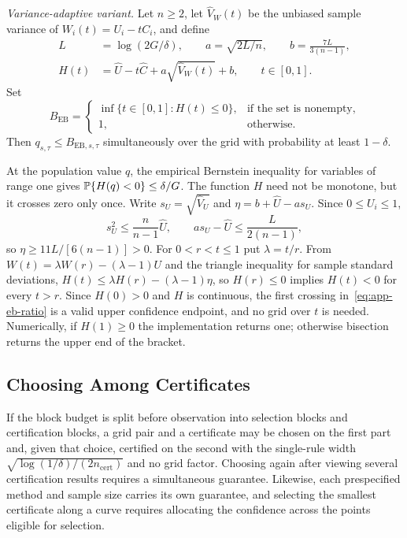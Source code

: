 \noindent\emph{Variance-adaptive variant.}\quad
Let $n\ge2$, let $\widehat V_W(t)$ be the unbiased sample variance of $W_i(t)=U_i-tC_i$, and define
\begin{align}
L&=\log(2G/\delta),\qquad a=\sqrt{2L/n},\qquad b=\frac{7L}{3(n-1)},\\
H(t)&=\widehat U-t\widehat C+a\sqrt{\widehat V_W(t)}+b,\qquad t\in[0,1].
\end{align}
Set
\begin{equation}
B_{\mathrm{EB}}=
\begin{cases}
\inf\{t\in[0,1]:H(t)\le0\},&\text{if the set is nonempty},\\
1,&\text{otherwise}.
\end{cases}
\label{eq:app-eb-ratio}
\end{equation}
Then $q_{s,\tau}\le B_{\mathrm{EB},s,\tau}$ simultaneously over the grid with probability at least $1-\delta$.

At the population value $q$, the empirical Bernstein inequality for variables of range one gives $\mathbb{P}\{H(q)<0\}\le\delta/G$. The function $H$ need not be monotone, but it crosses zero only once. Write $s_U=\sqrt{\widehat V_U}$ and $\eta=b+\widehat U-as_U$. Since $0\le U_i\le1$,
\begin{equation}
s_U^2\le\frac{n}{n-1}\widehat U,\qquad as_U-\widehat U\le\frac{L}{2(n-1)},
\end{equation}
so $\eta\ge11L/[6(n-1)]>0$. For $0<r<t\le1$ put $\lambda=t/r$. From $W(t)=\lambda W(r)-(\lambda-1)U$ and the triangle inequality for sample standard deviations,
$H(t)\le\lambda H(r)-(\lambda-1)\eta$,
so $H(r)\le0$ implies $H(t)<0$ for every $t>r$. Since $H(0)>0$ and $H$ is continuous, the first crossing in~\eqref{eq:app-eb-ratio} is a valid upper confidence endpoint, and no grid over $t$ is needed. Numerically, if $H(1)\ge0$ the implementation returns one; otherwise bisection returns the upper end of the bracket.

\subsection{Choosing Among Certificates}

If the block budget is split before observation into selection blocks and certification blocks, a grid pair and a certificate may be chosen on the first part and, given that choice, certified on the second with the single-rule width $\sqrt{\log(1/\delta)/(2n_{\mathrm{cert}})}$ and no grid factor. Choosing again after viewing several certification results requires a simultaneous guarantee. Likewise, each prespecified method and sample size carries its own guarantee, and selecting the smallest certificate along a curve requires allocating the confidence across the points eligible for selection.

